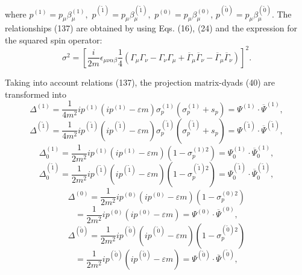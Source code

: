 \documentclass[a4paper,12pt]{article}
\begin{document}
where $p^{(1)}=p_\mu \beta _\mu ^{(1)},$
$p^{(\widetilde{1})}=p_\mu \beta _\mu ^{(\widetilde{1})},$
$p^{(0)}=p_\mu \beta _\mu ^{(0)}$, $p^{(\widetilde{ 0})}=p_\mu
\beta _\mu ^{(\widetilde{0})}$. The relationships (137) are
obtained by using Eqs. (16), (24) and the expression for the
squared spin operator:
\begin{equation}
\sigma ^2=\left[ \frac i{2m}\epsilon _{\mu \nu \alpha \beta }\frac
14\left( \Gamma _\mu \Gamma _\nu -\Gamma _\nu \Gamma _\mu
+\overline{\Gamma }_\mu \overline{\Gamma }_\nu -\overline{\Gamma
}_\mu \overline{\Gamma }_\nu \right) \right] ^2  .\label{138}
\end{equation}

Taking into account relations (137), the projection matrix-dyads
(40) are transformed into
\begin{equation}
\Delta ^{(1)}=\frac 1{4m^2}ip^{(1)}\left( ip^{(1)}-\varepsilon
m\right) \sigma _p^{(1)}\left( \sigma _p^{(1)}+s_p\right) =\Psi
^{(1)}\cdot \overline{ \Psi }^{(1)}  ,\label{139}
\end{equation}
\begin{equation}
\Delta ^{(\widetilde{1})}=\frac 1{4m^2}ip^{(\widetilde{1})}\left(
ip^{( \widetilde{1})}-\varepsilon m\right) \sigma
_p^{(\widetilde{1})}\left( \sigma _p^{(\widetilde{1})}+s_p\right)
=\Psi ^{(\widetilde{1})}\cdot \overline{\Psi }^{(\widetilde{1})} ,
\label{140}
\end{equation}
\begin{equation}
\Delta _0^{(1)}=\frac 1{2m^2}ip^{(1)}\left( ip^{(1)}-\varepsilon
m\right) \left( 1-\sigma _p^{(1)2}\right) =\Psi _0^{(1)}\cdot
\overline{\Psi }_0^{(1)} ,\label{141}
\end{equation}
\begin{equation}
\Delta _0^{(\widetilde{1})}=\frac
1{2m^2}ip^{(\widetilde{1})}\left( ip^{(
\widetilde{1})}-\varepsilon m\right) \left( 1-\sigma
_p^{(\widetilde{1} )2}\right) =\Psi _0^{(\widetilde{1})}\cdot
\overline{\Psi }_0^{(\widetilde{1} )} , \label{142}
\end{equation}
\[
\Delta ^{(0)}=\frac 1{2m^2}ip^{(0)}\left( ip^{(0)}-\varepsilon m\right)
\left( 1-\sigma _p^{(0)2}\right)
\]
\vspace{-8mm}
\begin{equation}  \label{143}
\end{equation}
\vspace{-8mm}
\[
=\frac 1{2m^2}ip^{(0)}\left( ip^{(0)}-\varepsilon m\right) =\Psi
^{(0)}\cdot \overline{\Psi }^{(0)} ,
\]
\[
\Delta ^{(\widetilde{0})}=\frac 1{2m^2}ip^{(\widetilde{0})}\left(
ip^{( \widetilde{0})}-\varepsilon m\right) \left( 1-\sigma
_p^{(\widetilde{0} )2}\right)
\]
\vspace{-8mm}
\begin{equation}  \label{144}
\end{equation}
\vspace{-8mm}
\[
=\frac 1{2m^2}ip^{(\widetilde{0})}\left(
ip^{(\widetilde{0})}-\varepsilon m\right) =\Psi
^{(\widetilde{0})}\cdot \overline{\Psi }^{(\widetilde{0})} ,
\]
\end{document}
